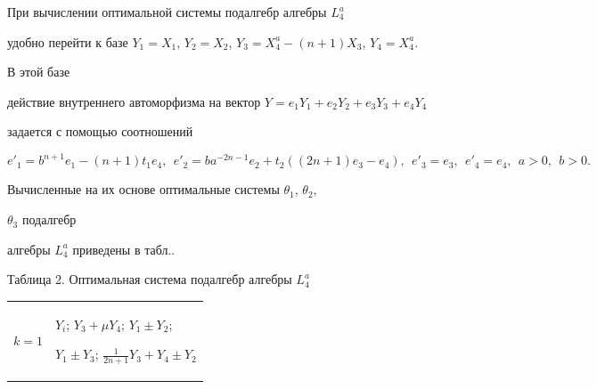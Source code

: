  


 


При вычислении оптимальной системы подалгебр алгебры $L^a_4$ 


удобно перейти к базе $Y_1=X_1$, $Y_2=X_2$, $Y_3=X^a_4-(n+1)X_3$, $Y_4=X^a_4$. 


В этой базе 


действие внутреннего автоморфизма на вектор $Y=e_1Y_1+e_2Y_2+e_3Y_3+e_4Y_4$ 


задается с помощью соотношений 


$$ 


e'_1=b^{n+1}e_1-(n+1)t_1e_4,\ \ e'_2=b a^{-2n-1}e_2+t_2 


((2n+1)e_3-e_4),\ \ e'_3=e_3,\ \ e'_4=e_4,\ \ a>0,\ \ b>0. 


$$ 


Вычисленные на их основе оптимальные системы $\theta_1$, $\theta_2$, 


$\theta_3$ подалгебр 


алгебры $L^a_4$ приведены в табл..  




 





 


\begin{center} 


Таблица 2. Оптимальная система подалгебр алгебры $L^a_4$ 


\begin{tabular}{|p{1cm}|p{14cm}|} 


\hline 


$k=1$ & \parbox{14cm}{$Y_i$; $Y_3+\mu Y_4$; $Y_1\pm Y_2$; 


$Y_1\pm Y_3$; $\frac{1}{2n+1}Y_3+Y_4\pm Y_2$}\\ 


\hline 


$k=2$ & \parbox{14cm}{$Y_i$, $Y_j$; $Y_1$, $Y_3+\mu Y_4$; 


$Y_2$, $Y_3+\mu Y_4$; $Y_2$, $Y_1+\mu Y_3$; $Y_1$, 


$\frac{1}{2n+1}Y_3\pm Y_2$; $Y_1+\mu Y_2$, 


$Y_3-\frac{2n+1}{n}Y_4$} \\ 


\hline 


$k=3$ & \parbox{14cm}{$Y_i$, $Y_j$, $Y_s$; $Y_1$, $Y_2$, 


$Y_3+\mu Y_4$}\\ 


\hline 


\end{tabular} 


\end{center} 


